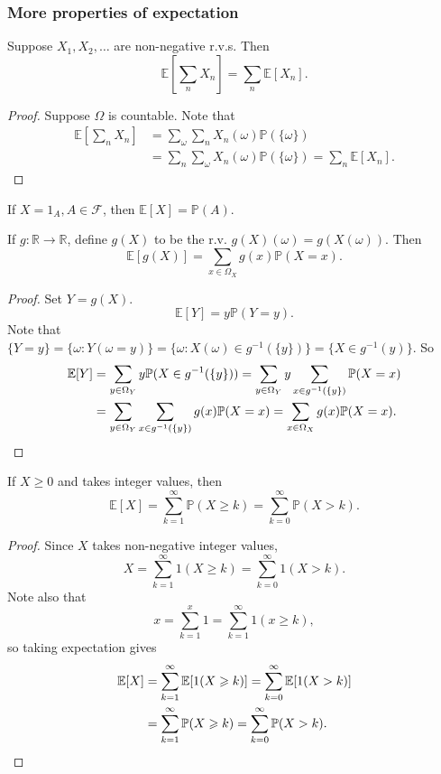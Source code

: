 \subsubsection*{More properties of expectation}
\begin{proposition}
    Suppose $ X_1,X_2,\dots $ are non-negative r.v.s. Then 
    \[
        \mathbb{E} \left[ \sum_n X_n \right] = \sum_n \mathbb{E}[X_n].
    \]
\end{proposition}
\begin{proof}
    Suppose $\Omega$ is countable. Note that 
    \begin{align*}
        \mathbb{E}\left[ \sum_n X_n \right] &= \sum_\omega \sum_n X_n(\omega)\mathbb{P}(\{\omega\})\\ 
        &= \sum_n\sum_\omega X_n(\omega)\mathbb{P}(\{\omega\}) = \sum_n\mathbb{E}[X_n].
    \end{align*}
\end{proof}

\begin{proposition}
    If $ X=1_A,A\in \mathscr{F} $, then $ \mathbb{E}[X]=\mathbb{P}(A) $.
\end{proposition}
\begin{proposition}
    If $g:\mathbb{R}\to \mathbb{R}$, define $ g(X) $ to be the r.v. $ g(X)(\omega)=g(X(\omega)) $. Then 
    \[
        \mathbb{E}[g(X)] = \sum_{x\in \Omega_X} g(x)\mathbb{P}(X=x).
    \]
\end{proposition}
\begin{proof}
    Set $Y=g(X)$. 
    \[
        \mathbb{E}[Y] = y \mathbb{P}(Y=y).
    \]
    Note that $ \{Y=y\} = \{\omega:Y(\omega=y)\} = \{\omega:X(\omega)\in g^{-1}(\{y\})\} = \{X\in g^{-1}(y)\} $. So 
    \begin{align*}
        \mathbb{E}[Y]&= \sum_{y\in \Omega_Y}y \mathbb{P}(X\in g^{-1}(\{y\}))=\sum_{y\in \Omega_Y}y \sum_{x\in g^{-1}(\{y\})}\mathbb{P}(X=x)\\
        &= \sum_{y\in \Omega_Y}\sum_{x\in g^{-1}(\{y\})}g(x)\mathbb{P}(X=x)= \sum_{x\in \Omega_X} g(x)\mathbb{P}(X=x).\qedhere
    \end{align*}
\end{proof}

\begin{proposition}
    If $ X\ge 0 $ and takes integer values, then 
    \[
        \mathbb{E}[X] = \sum_{k=1}^{\infty} \mathbb{P}(X\ge k) = \sum_{k=0}^{\infty}\mathbb{P}(X>k).
    \]
\end{proposition}
\begin{proof}
    Since $X$ takes non-negative integer values, 
    \[
        X = \sum_{k=1}^{\infty}1(X\ge k) = \sum_{k=0}^{\infty}1(X>k).
    \]
    Note also that 
    \[
        x = \sum_{k=1}^{x}1 = \sum_{k=1}^{\infty} 1(x\ge k),
    \]
    so taking expectation gives 
    \begin{align*}
        \mathbb{E}[X] &= \sum_{k=1}^{\infty}\mathbb{E}[1(X\ge k)] = \sum_{k=0}^{\infty}\mathbb{E}[1(X>k)]\\ 
        &= \sum_{k=1}^{\infty} \mathbb{P}(X\ge k) = \sum_{k=0}^{\infty}\mathbb{P}(X>k).\qedhere
    \end{align*}
\end{proof}


